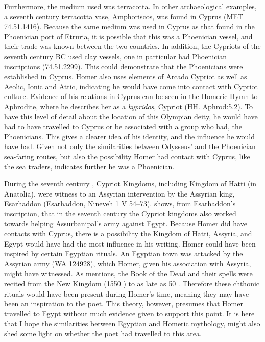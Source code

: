 	Furthermore, the medium used was terracotta. In other archaeological examples, a seventh century \BC terracotta vase, Amphoriscos, was found in Cyprus (MET 74.51.1416). Because the same medium was used in Cyprus as that found in the Phoenician port of Etruria, it is possible that this was a Phoenician vessel, and their trade was known between the two countries. In addition, the Cypriots of the seventh century BC used clay vessels, one in particular had Phoenician inscriptions (74.51.2299). This could demonstrate that the Phoenicians were established in Cyprus.  Homer also uses elements of Arcado Cypriot \parencite{Willmott2007} as well as Aeolic, Ionic and Attic, indicating he would have come into contact with Cypriot culture. Evidence of his relations in Cyprus can be seen in the Homeric Hymn to Aphrodite, where he describes her as a \emph{kypridos}, Cypriot (HH. Aphrod:5.2). To have this level of detail about the location of this Olympian deity, he would have had to have travelled to Cyprus or be associated with a group who had, the Phoenicians.  This gives a clearer idea of his identity, and the influence he would have had. Given not only the similarities between Odysseus’ and the Phoenician sea-faring routes, but also the possibility Homer had contact with Cyprus, like the sea traders, indicates further he was a Phoenician.
	
	During the seventh century \BC, Cypriot Kingdoms, including Kingdom of Hatti (in Anatolia), were witness to an Assyrian intervention by the Assyrian king, Esarhaddon (Esarhaddon, Nineveh 1 V 54–73). \textcite{Radner2012} shows, from Esarhaddon’s inscription, that in the seventh century the Cypriot kingdoms also worked towards helping Assurbanipal’s army against Egypt.  Because Homer did have contacts with Cyprus, there is a possibility the Kingdom of Hatti, Assyria, and Egypt would have had the most influence in his writing. Homer could have been inspired by certain Egyptian rituals. An Egyptian town was attacked by the Assyrian army (WA 124928), which Homer, given his association with Assyria, might have witnessed. As \textcite[54]{Taylor2010} mentions, the Book of the Dead and their spells were recited from the New Kingdom (1550 \BC) to as late as 50 \BC. Therefore these chthonic rituals would have been present during Homer’s time, meaning they may have been an inspiration to the poet. This theory, however, presumes that Homer travelled to Egypt without much evidence given to support this point. It is here that I hope the similarities between Egyptian and Homeric mythology, might also shed some light on whether the poet had travelled to this area.
	
